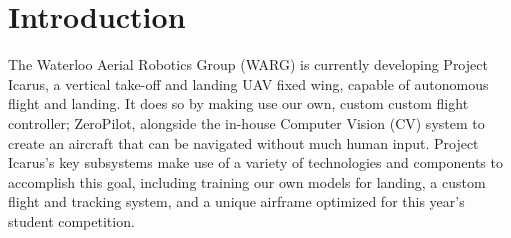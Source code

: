 \section{Introduction}
\label{sec:introduction}

The Waterloo Aerial Robotics Group (WARG) is currently developing Project
Icarus, a vertical take-off and landing UAV fixed wing, capable of autonomous
flight and landing. It does so by making use our own, custom custom flight
controller; ZeroPilot, alongside the in-house Computer Vision (CV) system to
create an aircraft that can be navigated without much human input. Project
Icarus's key subsystems make use of a variety of technologies and components to
accomplish this goal, including training our own models for landing, a custom
flight and tracking system, and a unique airframe optimized for this year's
student competition.
